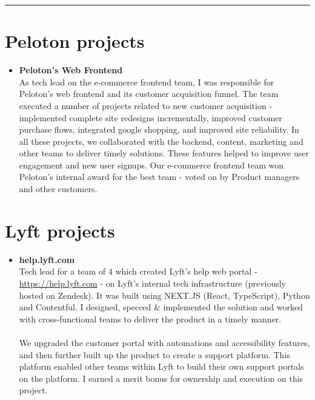 \documentclass[line, 11pt]{res}
\renewenvironment{resume}{\begingroup}{\endgroup}
\begin{document}
\begin{resume}
\vspace{-5pt}
\hrule

\vspace{-7pt}
\section{Peloton projects}
    \begin{itemize}
        \item \textbf{Peloton's Web Frontend}\\
As tech lead on the e-commerce frontend team, I was responsible for Peloton's web frontend and its customer acquisition funnel. The team executed a number of projects related to new customer acquisition - implemented complete site redesigns incrementally, improved customer purchase flows, integrated google shopping, and improved site reliability. In all these projects, we collaborated with the backend, content, marketing and other teams to deliver timely solutions. These features helped to improve user engagement and new user signups. Our e-commerce frontend team won Peloton's internal award for the best team - voted on by Product managers and other customers. 
    \end{itemize}
    
\vspace{-12pt}
\section{Lyft projects}
    \begin{itemize}
        \item \textbf{help.lyft.com}\\
Tech lead for a team of 4 which created Lyft's help web portal - \href{https://help.lyft.com}{https://help.lyft.com} - on Lyft's internal tech infrastructure (previously hosted on Zendesk). It was built using NEXT{\tiny.JS} (React, TypeScript), Python and Contentful. I designed, specced \& implemented the solution and worked with cross-functional teams to deliver the product in a timely manner.\\ \\ We upgraded the customer portal with automations and accessibility features, and then further built up the product to create a support platform. This platform enabled other teams within Lyft to build their own support portals on the platform. I earned a merit bonus for ownership and execution on this project.
    \end{itemize}


\end{resume}
\end{document}
